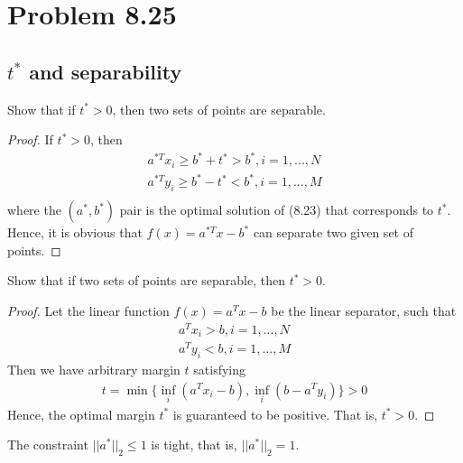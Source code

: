 \documentclass[11pt,a4paper]{article}
\begin{document}
\newpage
\section{Problem 8.25}
\newcommand{\ta}{\tilde{a}}
\newcommand{\tb}{\tilde{b}}
\subsection{$t^*$ and separability}
\begin{lemma}
Show that if $t^* > 0$, then two sets of points are separable.
\end{lemma}
\begin{proof}
If $t^* > 0$, then 
\begin{align}
    a^{*T} x_i \geq b^* + t^* > b^*, i = 1, ..., N \\
    a^{*T} y_i \geq b^* - t^* < b^*, i = 1, ..., M \\
\end{align}
where the $(a^*, b^*)$ pair is the optimal solution of (8.23) that
corresponds to $t^*$.
Hence, it is obvious that $f(x) = a^{*T}x - b^*$ can separate two given set of
points.
\end{proof}
\begin{lemma}
Show that if two sets of points are separable, then $t^* > 0$.
\end{lemma}
\begin{proof}
    Let the linear function $f(x) = a^T x - b$ be the linear separator, such
    that 
    \begin{align}
        a^T x_i > b, i = 1, ..., N \\
        a^T y_i < b, i = 1, ..., M
    \end{align}
    Then we have arbitrary margin $t$ satisfying
    \begin{align}
        t = \min\{ \inf_i(a^T x_i - b), \inf_i (b-a^T y_i) \} > 0
    \end{align}
    Hence, the optimal margin $t^*$ is guaranteed to be positive. That is, $t^*
    > 0$.
\end{proof}
\begin{lemma}
    The constraint $||a^*||_2 \leq 1$ is tight, that is, $||a^*||_2 = 1$.
\end{lemma}
\end{document}
